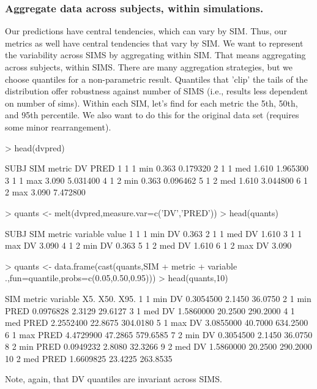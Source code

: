 \subsubsection{Aggregate data across subjects, within simulations.}
Our predictions have central tendencies, which can vary by SIM.
Thus, our metrics as well have central tendencies that vary by SIM.
We want to represent the variability across SIMS by aggregating within SIM.
That means aggregating across subjects, within SIMS.  
There are many aggregation strategies, but we choose quantiles for a non-parametric 
result. Quantiles that 'clip' the tails of the distribution offer robustness against
number of SIMS (i.e., results less dependent on number of sims).  
Within each SIM, let's find for each metric the 5th, 50th, and 95th percentile.
We also want to do this for the original data set (requires some minor rearrangement).
\begin{Schunk}
\begin{Sinput}
> head(dvpred)
\end{Sinput}
\begin{Soutput}
  SUBJ SIM metric    DV     PRED
1    1   1    min 0.363 0.179320
2    1   1    med 1.610 1.965300
3    1   1    max 3.090 5.031400
4    1   2    min 0.363 0.096462
5    1   2    med 1.610 3.044800
6    1   2    max 3.090 7.472800
\end{Soutput}
\begin{Sinput}
> quants <- melt(dvpred,measure.var=c('DV','PRED'))
> head(quants)
\end{Sinput}
\begin{Soutput}
  SUBJ SIM metric variable value
1    1   1    min       DV 0.363
2    1   1    med       DV 1.610
3    1   1    max       DV 3.090
4    1   2    min       DV 0.363
5    1   2    med       DV 1.610
6    1   2    max       DV 3.090
\end{Soutput}
\begin{Sinput}
> quants <- data.frame(cast(quants,SIM + metric + variable ~ .,fun=quantile,probs=c(0.05,0.50,0.95)))
> head(quants,10)
\end{Sinput}
\begin{Soutput}
   SIM metric variable       X5.    X50.     X95.
1    1    min       DV 0.3054500  2.1450  36.0750
2    1    min     PRED 0.0976828  2.3129  29.6127
3    1    med       DV 1.5860000 20.2500 290.2000
4    1    med     PRED 2.2552400 22.8675 304.0180
5    1    max       DV 3.0855000 40.7000 634.2500
6    1    max     PRED 4.4729900 47.2865 579.6585
7    2    min       DV 0.3054500  2.1450  36.0750
8    2    min     PRED 0.0949232  2.8080  32.3266
9    2    med       DV 1.5860000 20.2500 290.2000
10   2    med     PRED 1.6609825 23.4225 263.8535
\end{Soutput}
\end{Schunk}
Note, again, that DV quantiles are invariant across SIMS.

